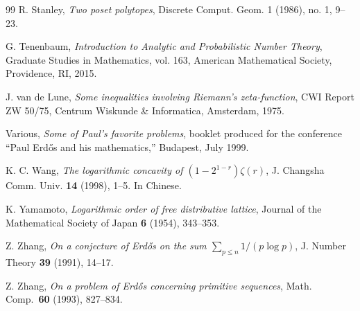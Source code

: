 \documentclass[12pt]{amsart}
\theoremstyle{definition}
\theoremstyle{remark}
\numberwithin{equation}{section}
\newcommand{\1}{{\mathbf 1}}
\newcommand{\Erdos}{{Erd\H{o}s}}
\begin{document}
\begin{thebibliography}{99}
R. Stanley, \emph{Two poset polytopes},
Discrete Comput. Geom. 1 (1986), no. 1, 9--23.

G. Tenenbaum,
\emph{Introduction to Analytic and Probabilistic Number Theory},
Graduate Studies in Mathematics, vol. 163,
American Mathematical Society, Providence, RI, 2015.

J. van de Lune,
\emph{Some inequalities involving Riemann's zeta-function},
CWI Report ZW 50/75, Centrum Wiskunde \& Informatica, Amsterdam, 1975.

Various,
\emph{Some of Paul's favorite problems},
booklet produced for the conference ``Paul \Erdos{} and his mathematics,''
Budapest, July 1999.

K. C. Wang,
\emph{The logarithmic concavity of $(1-2^{1-r})\zeta(r)$},
J. Changsha Comm. Univ. \textbf{14} (1998), 1--5. In Chinese.

K. Yamamoto, \emph{Logarithmic order of free distributive lattice}, Journal of the Mathematical Society of Japan \textbf{6} (1954), 343--353.

 Z. Zhang, \textit{On a conjecture of Erd\H os on the sum $\sum_{p\le n} 1/(p \log p)$}, J. Number Theory {\bf 39} (1991), 14--17.

 Z. Zhang, \textit{On a problem of Erd\H os concerning primitive sequences}, Math. Comp.\ {\bf 60} (1993), 827--834.


\end{thebibliography}
\end{document}

